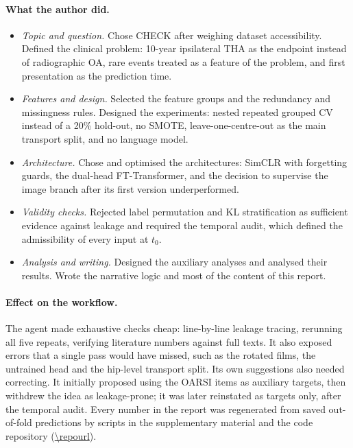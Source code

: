 \paragraph{What the author did.}
\begin{itemize}[leftmargin=*,itemsep=1pt]
  \item \emph{Topic and question.} Chose CHECK after weighing dataset accessibility. Defined the clinical problem: 10-year ipsilateral THA as the endpoint instead of radiographic OA, rare
        events treated as a feature of the problem, and first presentation as the prediction time.
  \item \emph{Features and design.} Selected the feature groups and the redundancy and missingness rules. Designed the
        experiments: nested repeated grouped CV instead of a 20\% hold-out, no SMOTE, leave-one-centre-out as the main
        transport split, and no language model.
  \item \emph{Architecture.} Chose and optimised the architectures: SimCLR with forgetting guards, the dual-head
        FT-Transformer, and the decision to supervise the image branch after its first version underperformed.
  \item \emph{Validity checks.} Rejected label permutation and KL stratification as sufficient evidence against leakage
        and required the temporal audit, which defined the admissibility of every input at $t_0$.
  \item \emph{Analysis and writing.} Designed the auxiliary analyses and analysed their results. Wrote the narrative
        logic and most of the content of this report.
\end{itemize}

\paragraph{Effect on the workflow.} The agent made exhaustive checks cheap: line-by-line leakage tracing, rerunning all
five repeats, verifying literature numbers against full texts. It also exposed errors that a single pass would have
missed, such as the rotated films, the untrained head and the hip-level transport split. Its own suggestions also needed
correcting. It initially proposed using the OARSI items as auxiliary targets, then withdrew the idea as leakage-prone; it
was later reinstated as targets only, after the temporal audit. Every number in the report was regenerated from saved
out-of-fold predictions by scripts in the supplementary material and the code repository (\url{\repourl}).
